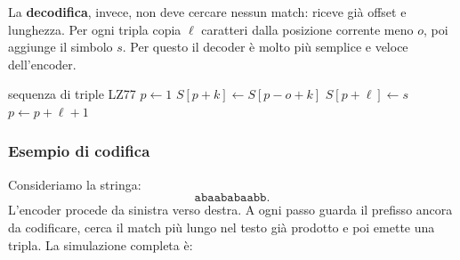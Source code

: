\documentclass{article}
\theoremstyle{definition}
\numberwithin{equation}{section}
\begin{document}
La \textbf{decodifica}, invece, non deve cercare nessun match: riceve già
offset e lunghezza. Per ogni tripla copia $\ell$ caratteri dalla posizione
corrente meno $o$, poi aggiunge il simbolo $s$. Per questo il decoder è
molto più semplice e veloce dell'encoder.

\begin{algorithm}[H]
    \caption{Schema di decodifica LZ77}
    \begin{algorithmic}[1]
        \Require sequenza di triple LZ77
        \State $p\gets 1$
        \State $S[p+k]\gets S[p-o+k]$
        \EndFor
        \State $S[p+\ell]\gets s$
        \State $p\gets p+\ell+1$
        \EndFor
    \end{algorithmic}
    \label{alg:lz77_decoding}
\end{algorithm}

\subsubsection{Esempio di codifica}
Consideriamo la stringa:
\[
    \texttt{abaababaabb}.
\]
L'encoder procede da sinistra verso destra. A ogni passo guarda il
prefisso ancora da codificare, cerca il match più lungo nel testo già
prodotto e poi emette una tripla. La simulazione completa è:
\end{document}
